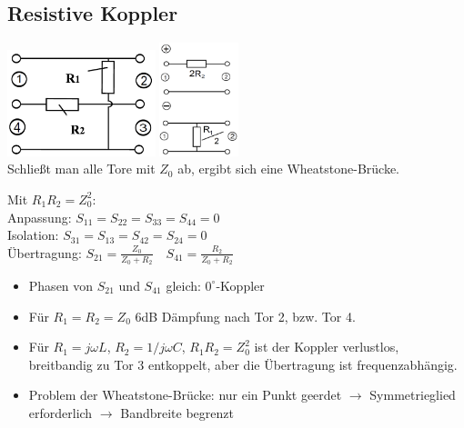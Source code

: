 \documentclass[english]{latex4ei/latex4ei_sheet}
\begin{document}
\begin{sectionbox}
    \subsection{Resistive Koppler}
    \includegraphics[width = 4.3cm]{./img/resistiver_koppler.png}
    \includegraphics[width = 2.3cm]{./img/resistiver_koppler_evenodd.png}\\
    Schließt man alle Tore mit $Z_0$ ab, ergibt sich eine Wheatstone-Brücke.\\
    \begin{emphbox}
        Mit $R_1 R_2 = Z_0^2$:\\
        \vspace{1em}
        Anpassung: $S_{11}=S_{22}=S_{33}=S_{44}=0$\\
        Isolation: $S_{31}=S_{13} = S_{42} = S_{24} =0$\\
        Übertragung: $S_{21}=\frac{Z_{0}}{Z_{0}+R_{2}} \quad S_{41}=\frac{R_{2}}{Z_{0}+R_{2}}$
    \end{emphbox}
    \begin{itemize}
        \item Phasen von $S_{21}$ und $S_{41}$ gleich: $0^{\circ}$-Koppler
        \item Für $R_{1}=R_{2}=Z_{0}$ 6dB Dämpfung nach Tor 2, bzw. Tor 4.
        \item Für $R_1 = j \omega L$, $R_2 = 1 / j \omega C$, $R_1R_2 = Z_0^2$ ist der Koppler verlustlos, breitbandig zu Tor 3 entkoppelt, aber die Übertragung ist frequenzabhängig.
        \item Problem der Wheatstone-Brücke: nur ein Punkt geerdet $\rightarrow$ Symmetrieglied erforderlich $\rightarrow$ Bandbreite begrenzt
    \end{itemize}
\end{sectionbox}
\end{document}
